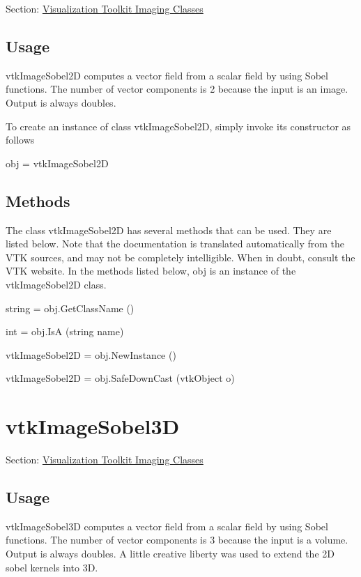 Section\-: \hyperlink{sec_vtkimaging}{Visualization Toolkit Imaging Classes} \hypertarget{vtkwidgets_vtkxyplotwidget_Usage}{}\subsection{Usage}\label{vtkwidgets_vtkxyplotwidget_Usage}
vtk\-Image\-Sobel2\-D computes a vector field from a scalar field by using Sobel functions. The number of vector components is 2 because the input is an image. Output is always doubles.

To create an instance of class vtk\-Image\-Sobel2\-D, simply invoke its constructor as follows \begin{DoxyVerb}  obj = vtkImageSobel2D
\end{DoxyVerb}
 \hypertarget{vtkwidgets_vtkxyplotwidget_Methods}{}\subsection{Methods}\label{vtkwidgets_vtkxyplotwidget_Methods}
The class vtk\-Image\-Sobel2\-D has several methods that can be used. They are listed below. Note that the documentation is translated automatically from the V\-T\-K sources, and may not be completely intelligible. When in doubt, consult the V\-T\-K website. In the methods listed below, {\ttfamily obj} is an instance of the vtk\-Image\-Sobel2\-D class. 
\begin{DoxyItemize}
\item {\ttfamily string = obj.\-Get\-Class\-Name ()}  
\item {\ttfamily int = obj.\-Is\-A (string name)}  
\item {\ttfamily vtk\-Image\-Sobel2\-D = obj.\-New\-Instance ()}  
\item {\ttfamily vtk\-Image\-Sobel2\-D = obj.\-Safe\-Down\-Cast (vtk\-Object o)}  
\end{DoxyItemize}\hypertarget{vtkimaging_vtkimagesobel3d}{}\section{vtk\-Image\-Sobel3\-D}\label{vtkimaging_vtkimagesobel3d}
Section\-: \hyperlink{sec_vtkimaging}{Visualization Toolkit Imaging Classes} \hypertarget{vtkwidgets_vtkxyplotwidget_Usage}{}\subsection{Usage}\label{vtkwidgets_vtkxyplotwidget_Usage}
vtk\-Image\-Sobel3\-D computes a vector field from a scalar field by using Sobel functions. The number of vector components is 3 because the input is a volume. Output is always doubles. A little creative liberty was used to extend the 2\-D sobel kernels into 3\-D.

